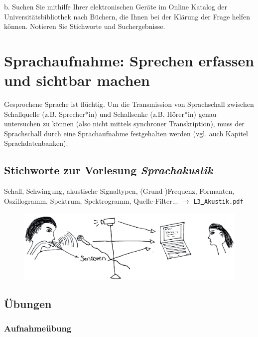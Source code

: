 \documentclass[11pt]{book}
\begin{document}
\vspace*{5cm}


b.	Suchen Sie mithilfe Ihrer elektronischen Geräte im Online Katalog der Universitätsbibliothek nach Büchern, die Ihnen bei der Klärung der Frage helfen können. Notieren Sie Stichworte und Suchergebnisse.
\vspace*{5cm}



\chapter{Sprachaufnahme: Sprechen erfassen und sichtbar machen} 

Gesprochene Sprache ist flüchtig. Um die Transmission von Sprachschall zwischen Schallquelle (z.\thinspace B. Sprecher*in) und Schallsenke (z.\thinspace B. Hörer*in) genau untersuchen zu können (also nicht mittels synchroner Transkription), muss der Sprachschall durch eine Sprachaufnahme festgehalten werden (vgl. auch Kapitel Sprachdatenbanken). 

\section{Stichworte zur Vorlesung \em{Sprachakustik}}

Schall, Schwingung, akustische Signaltypen, (Grund-)Frequenz, Formanten, Oszillogramm, Spektrum, Spektrogramm, Quelle-Filter... $\rightarrow$ {\tt L3\underline{\ }Akustik.pdf}
\begin{figure}[htbp]
\begin{center}
\includegraphics[width=\textwidth]{grafiken/sprachaufnahme/sprechen-erfassen}
\label{t2}
\end{center}
\end{figure}

\section{Übungen}

\subsection*{Aufnahmeübung}
\end{document}
